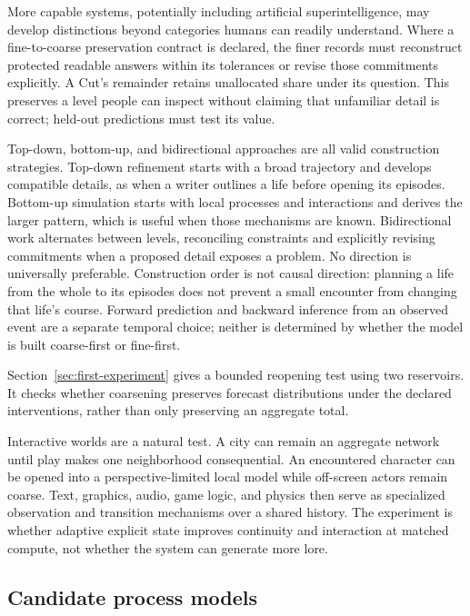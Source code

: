 \documentclass[10pt]{article}
\begin{document}
More capable systems, potentially including artificial superintelligence,
may develop distinctions beyond categories humans can readily understand.
Where a fine-to-coarse preservation contract is declared, the finer records
must reconstruct protected readable answers within its tolerances or revise
those commitments explicitly. A Cut's remainder retains unallocated share
under its question. This preserves a level people can inspect without claiming
that unfamiliar detail is correct; held-out predictions must test its value.

Top-down, bottom-up, and bidirectional approaches are all valid construction
strategies. Top-down refinement starts with a broad trajectory and develops
compatible details, as when a writer outlines a life before opening its
episodes. Bottom-up simulation starts with local processes and interactions
and derives the larger pattern, which is useful when those mechanisms are
known. Bidirectional work alternates between levels, reconciling constraints
and explicitly revising commitments when a proposed detail exposes a problem.
No direction is universally preferable. Construction order is not causal
direction: planning a life from the whole to its episodes does not prevent a
small encounter from changing that life's course. Forward prediction and
backward inference from an observed event are a separate temporal choice;
neither is determined by whether the model is built coarse-first or fine-first.

Section~\ref{sec:first-experiment} gives a bounded reopening test using two
reservoirs. It checks whether coarsening preserves forecast distributions under
the declared interventions, rather than only preserving an aggregate total.

Interactive worlds are a natural test. A city can remain an aggregate network
until play makes one neighborhood consequential. An encountered character can
be opened into a perspective-limited local model while off-screen actors remain
coarse. Text, graphics, audio, game logic, and physics then serve as specialized
observation and transition mechanisms over a shared history. The experiment is
whether adaptive explicit state improves continuity and interaction at matched
compute, not whether the system can generate more lore.

\subsection{Candidate process models}
\label{sec:functions}
\end{document}
